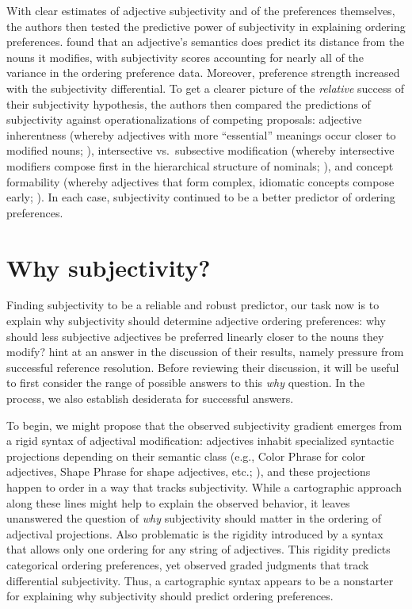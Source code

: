 \documentclass{sp}
\begin{document}
With clear estimates of adjective subjectivity and of the preferences themselves, the authors then tested the predictive power of subjectivity in explaining ordering preferences. %
\citeauthor{scontrasetal2017adjectives} found that an adjective's semantics does predict its distance from the nouns it modifies, with subjectivity scores accounting for nearly all of the variance in the ordering preference data. Moreover, preference strength increased with the subjectivity differential. To get a clearer picture of the \emph{relative} success of their subjectivity hypothesis, the authors then compared the predictions of subjectivity against operationalizations of competing proposals: adjective inherentness (whereby adjectives with more ``essential'' meanings occur closer to modified nouns; \citealp[e.g.,][]{whorf1945}), intersective vs.~subsective modification (whereby intersective modifiers compose first in the hierarchical structure of nominals; \citealp{truswell2009}), and concept formability (whereby adjectives that form complex, idiomatic concepts compose early; \citealp[e.g.][]{mcnallyboleda2004}). In each case, subjectivity continued to be a better predictor of ordering preferences.


\section{Why subjectivity?} \label{why}

Finding subjectivity to be a reliable and robust predictor, our task now is to explain why subjectivity should determine adjective ordering preferences: why should less subjective adjectives be preferred linearly closer to the nouns they modify? \citeauthor{scontrasetal2017adjectives} hint at an answer in the discussion of their results, namely pressure from successful reference resolution. Before reviewing their discussion, it will be useful to first consider the range of possible answers to this \emph{why} question. In the process, we also establish desiderata for successful answers.

To begin, we might propose that the observed subjectivity gradient emerges from a rigid syntax of adjectival modification: adjectives inhabit specialized syntactic projections depending on their semantic class (e.g., Color Phrase for color adjectives, Shape Phrase for shape adjectives, etc.; \citealp{cinque1994,scott2002}), and these projections happen to order in a way that tracks subjectivity. While a cartographic approach along these lines might help to explain the observed behavior, it leaves unanswered the question of \emph{why} subjectivity should matter in the ordering of adjectival projections. Also problematic is the rigidity introduced by a syntax that allows only one ordering for any string of adjectives. This rigidity predicts categorical ordering preferences, yet \citeauthor{scontrasetal2017adjectives} observed graded judgments that track differential subjectivity. Thus, a cartographic syntax appears to be a nonstarter for explaining why subjectivity should predict ordering preferences.
\end{document}
